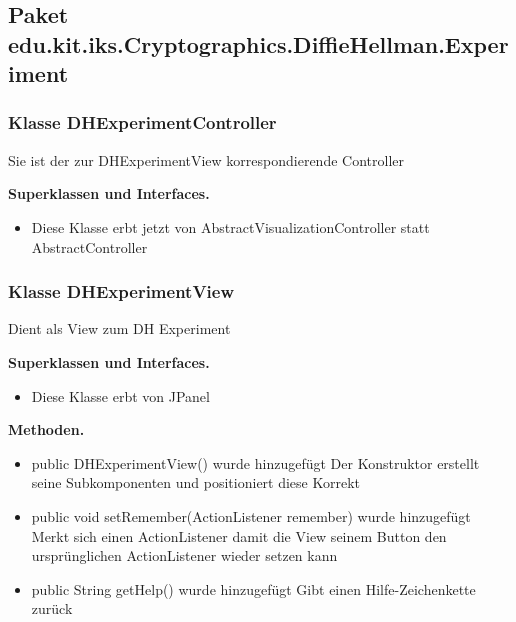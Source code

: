 \documentclass{article}
\begin{document}
  \subsection{Paket edu.kit.iks.Cryptographics.DiffieHellman.Experiment}
	\subsubsection{Klasse DHExperimentController}
    Sie ist der zur DHExperimentView korrespondierende Controller\newline

	    \textbf{Superklassen und Interfaces.}\newline
        \begin{itemize}
            \item Diese Klasse erbt jetzt von AbstractVisualizationController statt AbstractController\newline
        \end{itemize}

	\subsubsection{Klasse DHExperimentView}
    Dient als View zum DH Experiment\newline
    
	    \textbf{Superklassen und Interfaces.}\newline
        \begin{itemize}
            \item Diese Klasse erbt von JPanel\newline
        \end{itemize}

    \textbf{Methoden.}\newline
	   \begin{itemize}
           \item public DHExperimentView() wurde hinzugefügt\newline
               Der Konstruktor erstellt seine Subkomponenten und\newline
               positioniert diese Korrekt\newline
           \item public void setRemember(ActionListener remember) wurde hinzugefügt\newline
               Merkt sich einen ActionListener damit die View seinem Button den ursprünglichen\newline
               ActionListener wieder setzen kann\newline
           \item public String getHelp() wurde hinzugefügt\newline
               Gibt einen Hilfe-Zeichenkette zurück\newline
           \end{itemize}
\end{document}
